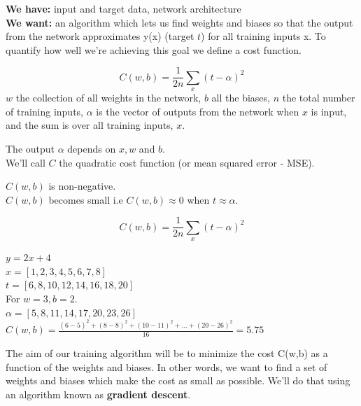 \documentclass[10pt, compress]{beamer}
\begin{document}
\begin{frame}
  \vspace{.5cm}
  \textbf{We have:} input and target data, network architecture \\
  \textbf{We want:} an algorithm which lets us find weights and biases so that the output from the network approximates y(x) (target $t$) for all training inputs x.  To quantify how well we're achieving this goal we define a cost function.

  $$ C(w, b) = \frac{1}{2n}\sum_x (t-\alpha)^2$$
  \textbf{$w$} the collection of all weights in the network, \textbf{$b$} all the biases, \textbf{$n$} the total number of training inputs, \textbf{$\alpha$} is the vector of outputs from the network when \textbf{$x$} is input, and the sum is over all training inputs, \textbf{$x$}.

  The output $\alpha$ depends on $x, w$ and $b$. \\
  We'll call $C$ the quadratic cost function (or mean squared error - MSE).

  $C(w,b)$ is non-negative. \\
  $C(w,b)$ becomes small i.e $C(w,b) \approx 0$ when $t \approx \alpha$.
\end{frame}

\begin{frame}

  $$ C(w, b) = \frac{1}{2n}\sum_x (t-\alpha)^2$$

  $ y = 2x + 4$ \\
  $x = [1, 2, 3, 4, 5, 6, 7, 8]$ \\
  $t = [6, 8, 10, 12, 14, 16, 18, 20]$ \\

  For $w = 3, b = 2$. \\
  $\alpha = [5, 8, 11, 14, 17, 20, 23, 26]$ \\ \hfill \break
  $C(w, b) = \frac{(6-5)^2 + (8-8)^2 + (10-11)^2 + ... + (20-26)^2}{16} = 5.75$ \\ \hfill \break

  The aim of our training algorithm will be to minimize the cost C(w,b) as a function of the weights and biases. In other words, we want to find a set of weights and biases which make the cost as small as possible. We'll do that using an algorithm known as \textbf{gradient descent}.
\end{frame}
\end{document}
